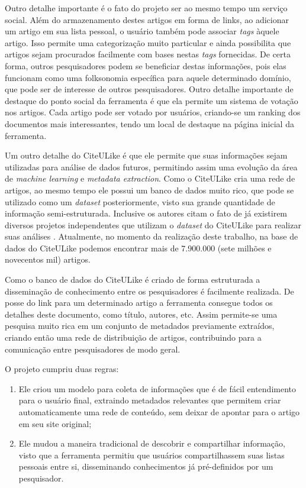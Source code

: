 Outro detalhe importante é o fato do projeto ser ao mesmo tempo um serviço social. Além do armazenamento destes artigos em forma de links, ao adicionar um artigo em sua lista pessoal, o usuário também pode associar \emph{tags} àquele artigo. Isso permite uma categorização muito particular e ainda possibilita que artigos sejam procurados facilmente com bases nestas \emph{tags} fornecidas. De certa forma, outros pesquisadores podem se beneficiar destas informações, pois elas funcionam como uma folksonomia específica para aquele determinado domínio, que pode ser de interesse de outros pesquisadores. Outro detalhe importante de destaque do ponto social da ferramenta é que ela permite um sistema de votação nos artigos. Cada artigo pode ser votado por usuários, criando-se um ranking dos documentos mais interessantes, tendo um local de destaque na página inicial da ferramenta.

Um outro detalhe do CiteULike é que ele permite que suas informações sejam utilizadas para análise de dados futuros, permitindo assim uma evolução da área de \emph{machine learning} e \emph{metadata extraction}. Como o CiteULike cria uma rede de artigos, ao mesmo tempo ele possui um banco de dados muito rico, que pode se utilizado como um \emph{dataset} posteriormente, visto sua grande quantidade de informação semi-estruturada. Inclusive os autores citam o fato de já existirem diversos projetos independentes que utilizam o \emph{dataset} do CiteULike para realizar suas análises \cite{citeulike}. Atualmente, no momento da realização deste trabalho, na base de dados do CiteULike podemos encontrar mais de 7.900.000 (sete milhões e novecentos mil) artigos.

Como o banco de dados do CiteULike é criado de forma estruturada a disseminação de conhecimento entre os pesquisadores é facilmente realizada. De posse do link para um determinado artigo a ferramenta consegue todos os detalhes deste documento, como título, autores, etc. Assim permite-se uma pesquisa muito rica em um conjunto de metadados previamente extraídos, criando então uma rede de distribuição de artigos, contribuindo para a comunicação entre pesquisadores de modo geral.

O projeto cumpriu duas regras:

\begin{enumerate}
    \item Ele criou um modelo para coleta de informações que é de fácil entendimento para o usuário final, extraindo metadados relevantes que permitem criar automaticamente uma rede de conteúdo, sem deixar de apontar para o artigo em seu site original;
    \item Ele mudou a maneira tradicional de descobrir e compartilhar informação, visto que a ferramenta permitiu que usuários compartilhassem suas listas pessoais entre si, disseminando conhecimentos já pré-definidos por um pesquisador.
\end{enumerate}

